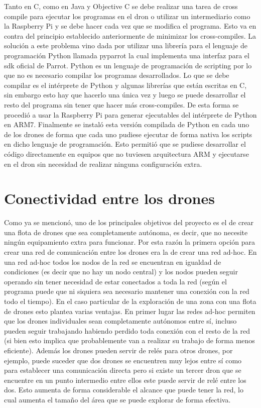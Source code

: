 Tanto en C, como en Java y Objective C se debe realizar una tarea de cross compile para ejecutar los programas en el dron o utilizar un intermediario como la Raspberry Pi y se debe hacer cada vez que se modifica el programa. Esto va en contra del principio establecido anteriormente de minimizar los cross-compiles. La solución a este problema vino dada por utilizar una librería para el lenguaje de programación Python llamada pyparrot la cual implementa una interfaz para el sdk oficial de Parrot. Python es un lenguaje de programación de scripting por lo que no es necesario compilar los programas desarrollados. Lo que se debe compilar es el intérprete de Python y algunas librerías que están escritas en C, sin embargo esto hay que hacerlo una única vez y luego se puede desarrollar el resto del programa sin tener que hacer más cross-compiles. De esta forma se procedió a usar la Raspberry Pi para generar ejecutables del intérprete de Python en ARM7. Finalmente se instaló esta versión compilada de Python en cada uno de los drones de forma que cada uno pudiese ejecutar de forma nativa los scripts en dicho lenguaje de programación. Esto permitió que se pudiese desarrollar el código directamente en equipos que no tuviesen arquitectura ARM y ejecutarse en el dron sin necesidad de realizar ninguna configuración extra.

\section {Conectividad entre los drones}
Como ya se mencionó, uno de los principales objetivos del proyecto es el de crear una flota de drones que sea completamente autónoma, es decir, que no necesite ningún equipamiento extra para funcionar. Por esta razón la primera opción para crear una red de comunicación entre los drones era la de crear una red ad-hoc. En una red ad-hoc todos los nodos de la red se encuentran en igualdad de condiciones (es decir que no hay un nodo central) y los nodos pueden seguir operando sin tener necesidad de estar conectados a toda la red (según el programa puede que ni siquiera sea necesario mantener una conexión con la red todo el tiempo). En el caso particular de la exploración de una zona con una flota de drones esto plantea varias ventajas. En primer lugar las redes ad-hoc permiten que los drones individuales sean completamente autónomos entre sí, incluso pueden seguir trabajando habiendo perdido toda conexión con el resto de la red (si bien esto implica que probablemente van a realizar su trabajo de forma menos eficiente). Además los drones pueden servir de relés para otros drones, por ejemplo, puede suceder que dos drones se encuentren muy lejos entre sí como para establecer una comunicación directa pero si existe un tercer dron que se encuentre en un punto intermedio entre ellos este puede servir de relé entre los dos. Esto aumenta de forma considerable el alcance que puede tener la red, lo cual aumenta el tamaño del área que se puede explorar de forma efectiva.

